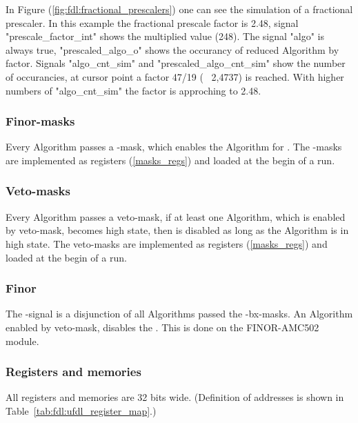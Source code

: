 In Figure (\ref{fig:fdl:fractional_prescalers}) one can see the simulation of a fractional prescaler. In this example the fractional prescale factor is 2.48, signal "prescale\_factor\_int" shows the multiplied value (248). The signal "algo" is always true, "prescaled\_algo\_o" shows the occurancy of reduced Algorithm by factor. Signals "algo\_cnt\_sim" and "prescaled\_algo\_cnt\_sim" show the number of occurancies, at cursor point a factor 47/19 (~ 2,4737) is reached. With higher numbers of "algo\_cnt\_sim" the factor is approching to 2.48.

\subsubsection{Finor-masks}
\label{sec:fdl:finor_masks}

Every Algorithm passes a \finor-mask, which enables the Algorithm for \finor.
The \finor-masks are implemented as registers (\ref{masks_regs}) and loaded at the begin of a run.

\subsubsection{Veto-masks}
\label{sec:fdl:veto_masks}

Every Algorithm passes a veto-mask, if at least one Algorithm, which is enabled by veto-mask, becomes high state, then \finor is disabled as long as the Algorithm is in high state.
The veto-masks are implemented as registers (\ref{masks_regs}) and loaded at the begin of a run.

\subsubsection{Finor}
\label{sec:fdl:finor}

The \finor-signal is a disjunction of all Algorithms passed the \finor-bx-masks. An Algorithm enabled by veto-mask, disables the \finor. This is done on the FINOR-AMC502 module.

\clearpage
\subsubsection{Registers and memories}
\label{sec:fdl:reg_mem}

All registers and memories are 32 bits wide. (Definition of addresses is shown in Table~\ref{tab:fdl:ufdl_register_map}.)


